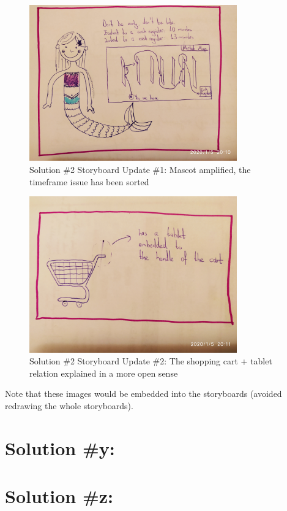 \documentclass[a4paper,10pt,oneside]{scrreprt}
\begin{document}
\begin{figure}[H]
	\centering
	\includegraphics[width=0.8\textwidth, clip, trim={10em 8em 25em 0em}]{images/s2_p1.jpg}
	\caption{Solution \#2 Storyboard Update \#1: \newline Mascot amplified, the timeframe issue has been sorted}
\end{figure}
\begin{figure}[H]
	\centering
	\includegraphics[width=0.8\textwidth, clip, trim={10em 50em 5em 20em}]{images/s2_p2.jpg}
	\caption{Solution \#2 Storyboard Update \#2: \newline The shopping cart + tablet relation explained in a more open sense}
\end{figure}
\bigskip
\bigskip
Note that these images would be embedded into the storyboards (avoided redrawing the whole storyboards).

\section{Solution \#y:}

\section{Solution \#z:}
				
\end{document}
